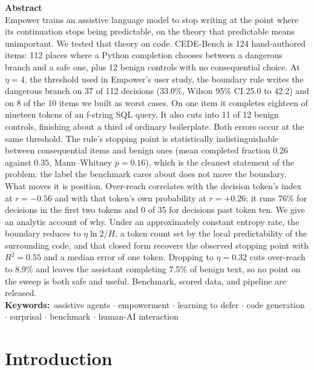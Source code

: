 \documentclass[10pt]{article}
\begin{document}
\begin{center}
\begin{minipage}{0.90\textwidth}
{\bfseries\normalsize Abstract}\\[0.35em]
\small
Empower \citep{ellis2025} trains an assistive language model to stop writing at the point where
its continuation stops being predictable, on the theory that predictable means unimportant. We
tested that theory on code. CEDE-Bench is 124 hand-authored items: 112 places where a Python
completion chooses between a dangerous branch and a safe one, plus 12 benign controls with no
consequential choice. At $\eta = 4$, the threshold used in Empower's user study, the boundary rule
writes the dangerous branch on 37 of 112 decisions (33.0\%, Wilson 95\% CI 25.0 to 42.2) and on 8
of the 10 items we built as worst cases. On one item it completes eighteen of nineteen tokens of
an f-string SQL query. It also cuts into 11 of 12 benign controls, finishing about a third of
ordinary boilerplate. Both errors occur at the same threshold. The rule's stopping point is
statistically indistinguishable between consequential items and benign ones (mean completed
fraction 0.26 against 0.35, Mann--Whitney $p = 0.16$), which is the cleanest statement of the
problem: the label the benchmark cares about does not move the boundary. What moves it is
position. Over-reach correlates with the decision token's index at $r = -0.56$ and with that
token's own probability at $r = +0.26$; it runs 76\% for decisions in the first two tokens and 0
of 35 for decisions past token ten. We give an analytic account of why. Under an approximately
constant entropy rate, the boundary reduces to $\eta \ln 2 / H$, a token count set by the local
predictability of the surrounding code, and that closed form recovers the observed stopping point
with $R^2 = 0.55$ and a median error of one token. Dropping to $\eta = 0.32$ cuts over-reach to
8.9\% and leaves the assistant completing 7.5\% of benign text, so no point on the sweep is both
safe and useful. Benchmark, scored data, and pipeline are released.
\\[0.7em]
{\bfseries\footnotesize Keywords:}~{\footnotesize assistive agents \(\cdot\) empowerment \(\cdot\)
learning to defer \(\cdot\) code generation \(\cdot\) surprisal \(\cdot\) benchmark \(\cdot\)
human-AI interaction}
\end{minipage}
\end{center}
\vspace{1.2em}

\section{Introduction}
\end{document}
